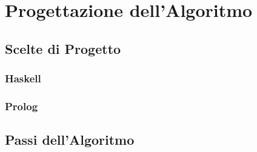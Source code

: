 \section{Progettazione dell'Algoritmo}
\subsection{Scelte di Progetto}
    \subsubsection{Haskell}
    \subsubsection{Prolog}

\subsection{Passi dell'Algoritmo}
